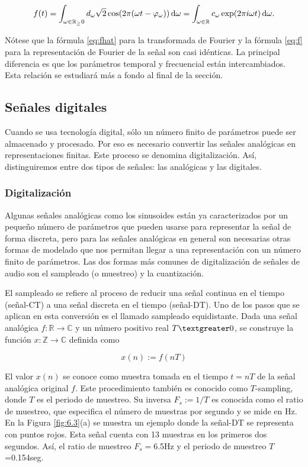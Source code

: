 \documentclass{article}
\begin{document}
\begin{equation} \label{eq:f}
    f(t) =\int_{\omega\in\mathbb{R}_\geq{0}}d_\omega\sqrt{2}\cos(2\pi(\omega t-\varphi_\omega))\,\mathrm{d} \omega
         =\int_{\omega\in\mathbb{R}}c_\omega\exp(2\pi i\omega t)\,\mathrm{d} \omega.
\end{equation}

Nótese que la fórmula \eqref{eq:fhat} para la transformada de Fourier y la fórmula \eqref{eq:f} para la representación de Fourier de la señal son casi idénticas. La principal diferencia es que los parámetros temporal y frecuencial están intercambiados. Esta relación se estudiará más a fondo al final de la sección.

\subsection{Señales digitales}

Cuando se usa tecnología digital, sólo un número finito de parámetros puede ser almacenado y procesado. Por eso es necesario convertir las señales analógicas en representaciones finitas. Este proceso se denomina digitalización. Así, distinguiremos entre dos tipos de señales: las analógicas y las digitales.

\subsubsection{Digitalización}
Algunas señales analógicas como los sinusoides están ya caracterizados por un pequeño número de parámetros que pueden usarse para representar la señal de forma discreta, pero para las señales analógicas en general son necesarias otras formas de modelado que nos permitan llegar a una representación con un número finito de parámetros. Las dos formas más comunes de digitalización de señales de audio son el sampleado (o muestreo) y la cuantización.

El sampleado se refiere al proceso de reducir una señal continua en el tiempo (señal-CT) a una señal discreta en el tiempo (señal-DT). Uno de los pasos que se aplican en esta conversión es el llamado sampleado equidistante. Dada una señal analógica $f:\mathbb{R}\rightarrow\mathbb{C}$ y un número positivo real $T\textgreater 0$, se construye la función $x:\mathbb{Z}\rightarrow\mathbb{C}$ definida como

\begin{equation}\label{eq:DT}
    x(n):=f(nT)
\end{equation}

El valor $x(n)$ se conoce como muestra tomada en el tiempo $t=nT$ de la señal analógica original $f$. Este procedimiento también es conocido como $T$-sampling, donde $T$ es el periodo de muestreo. Su inversa $F_s:=1/T$ es conocida como el ratio de muestreo, que especifica el número de muestras por segundo y se mide en Hz.
En la Figura \ref{fig:6.3}(a) se muestra un ejemplo donde la señal-DT se representa con puntos rojos. Esta señal cuenta con 13 muestras en los primeros dos segundos. Así, el ratio de muestreo $F_s=$6.5Hz y el periodo de muestreo $T$=0.154seg.
\end{document}
